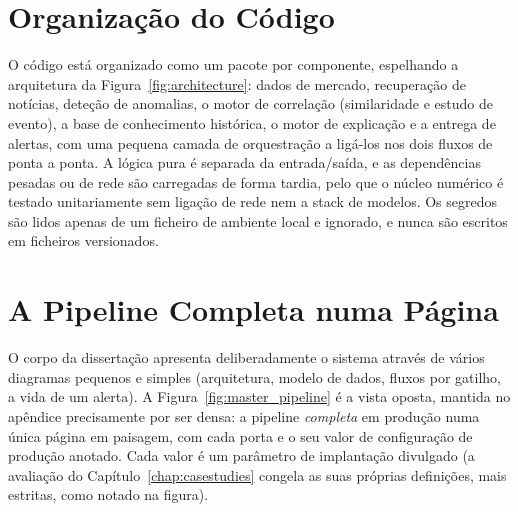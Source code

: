 \section{Organização do Código}
\label{app:repro_repo}

O código está organizado como um pacote por componente, espelhando a arquitetura da
Figura~\ref{fig:architecture}: dados de mercado, recuperação de notícias, deteção de anomalias, o motor de
correlação (similaridade e estudo de evento), a base de conhecimento histórica, o motor de explicação e a
entrega de alertas, com uma pequena camada de orquestração a ligá-los nos dois fluxos de ponta a ponta. A
lógica pura é separada da entrada/saída, e as dependências pesadas ou de rede são carregadas de forma
tardia, pelo que o núcleo numérico é testado unitariamente sem ligação de rede nem a stack de modelos. Os
segredos são lidos apenas de um ficheiro de ambiente local e ignorado, e nunca são escritos em ficheiros
versionados.

\section{A Pipeline Completa numa Página}
\label{app:repro_pipeline}

O corpo da dissertação apresenta deliberadamente o sistema através de vários diagramas pequenos e simples
(arquitetura, modelo de dados, fluxos por gatilho, a vida de um alerta). A Figura~\ref{fig:master_pipeline}
é a vista oposta, mantida no apêndice precisamente por ser densa: a pipeline \emph{completa} em produção
numa única página em paisagem, com cada porta e o seu valor de configuração de produção anotado. Cada valor
é um parâmetro de implantação divulgado (a avaliação do Capítulo~\ref{chap:casestudies} congela as suas
próprias definições, mais estritas, como notado na figura).

